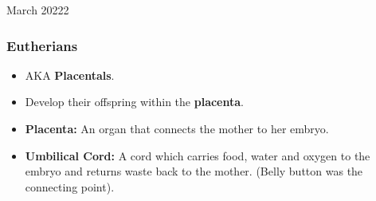 \documentclass[12pt,oneside]{book} %
\begin{document}
\begin{lec}{March 20222}
   \subsubsection*{Eutherians}
   \begin{itemize}
     \item AKA \textbf{Placentals}.
     \item Develop their offspring within the \textbf{placenta}.
     \item \textbf{Placenta:} An organ that connects the mother to her embryo.
     \item \textbf{Umbilical Cord:} A cord which carries food, water and oxygen to the embryo and returns waste back to the
     mother. (Belly button was the connecting point).
   \end{itemize}


















  





  




















	\end{lec}
\end{document}
